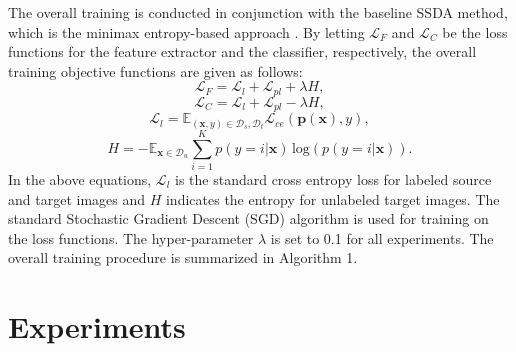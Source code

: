 \documentclass[a4paper,conference]{IEEEtran}
\begin{document}
The overall training is conducted in conjunction with the baseline SSDA method, which is the minimax entropy-based approach \cite{saito2019mme}. By letting $\mathcal{L}_{F}$ and $\mathcal{L}_{C}$ be the loss functions for the feature extractor and the classifier, respectively, the overall training objective functions are given as follows:
\begin{equation}
\mathcal{L}_{F}=\mathcal{L}_{l}+\mathcal{L}_{pl}+\lambda H,
\label{L_total1}
\end{equation}
\begin{equation}
\mathcal{L}_{C}=\mathcal{L}_{l}+\mathcal{L}_{pl}-\lambda H,
\label{L_total2}
\end{equation}
\begin{equation}
\mathcal{L}_{l}=\mathbb{E}_{(\mathbf{x}, y)\in\mathcal{D}_{s}, \mathcal{D}_{t}} \mathcal{L}_{ce}(\mathbf{p}(\mathbf{x}), y),
\label{L_l}
\end{equation}
\begin{equation}
H=-\mathbb{E}_{\mathbf{x}\in\mathcal{D}_{u}} \sum_{i=1}^{K}p(y=i|\mathbf{x})\,\text{log}(p(y=i|\mathbf{x})).
\label{H}
\end{equation}
In the above equations, $\mathcal{L}_{l}$ is the standard cross entropy loss for labeled source and target images and $H$ indicates the entropy \cite{saito2019mme} for unlabeled target images. The standard Stochastic Gradient Descent (SGD) algorithm is used for training on the loss functions. The hyper-parameter $\lambda$ is set to 0.1 for all experiments. The overall training procedure is summarized in Algorithm 1.


















\section{Experiments}
\label{sec:exp}
\end{document}
